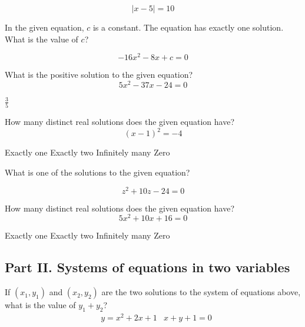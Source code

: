 \[
|x-5|=10
\]

\begin{solutionorbox}[1in]
\end{solutionorbox}

\question[1]
In the given equation, $c$ is a constant. The equation has exactly one solution. What is the value of $c$?

\[
-16 x^{2}-8 x+c=0
\]

\begin{solutionorbox}[1in]
\end{solutionorbox}

\question[1]
What is the positive solution to the given equation?
\[
5 x^{2}-37 x-24=0
\]
\begin{choices}
  \choice $\frac{3}{5}$
\end{choices}

\question[1]
How many distinct real solutions does the given equation have?
\[
(x-1)^{2}=-4
\]
\begin{choices}
  \choice Exactly one
  \choice Exactly two
  \choice Infinitely many
  \CorrectChoice Zero
\end{choices}

\question[1]
What is one of the solutions to the given equation?

\[
z^{2}+10 z-24=0
\]

\begin{solutionorbox}[1in]
\end{solutionorbox}

\question[1]
How many distinct real solutions does the given equation have?
\[
5 x^{2}+10 x+16=0
\]
\begin{choices}
  \choice Exactly one
  \choice Exactly two
  \choice Infinitely many
  \CorrectChoice Zero
\end{choices}


\newpage
{}
\subsection*{Part II. Systems of equations in two variables}

\question[1]
If $\left(x_{1}, y_{1}\right)$ and $\left(x_{2}, y_{2}\right)$ are the two solutions to the system of equations above, what is the value of $y_{1}+y_{2}$?
\[
\begin{aligned}
& y=x^{2}+2 x+1 
& x+y+1=0
\end{aligned}
\]
\begin{choices}
\end{choices}

